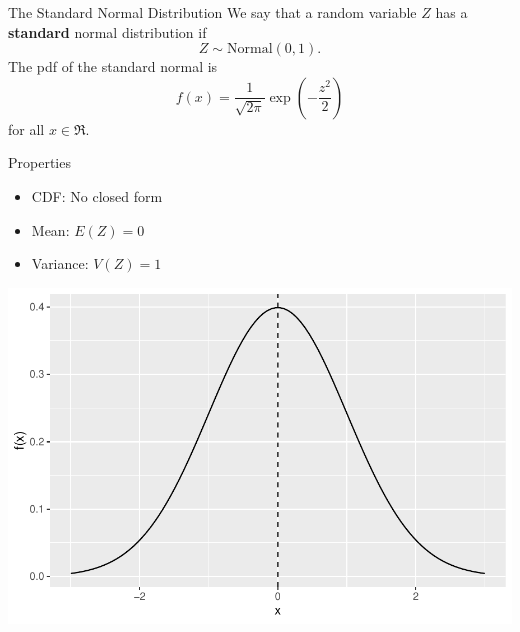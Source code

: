 \begin{frame}
\end{frame}

\begin{frame}
  
  \begin{block}{The Standard Normal Distribution}
    We say that a random variable $Z$ has a \textbf{standard} normal distribution if 
    $$
    Z \sim \mbox{Normal}(0,1).
    $$
    The pdf of the standard normal is
    \[
      f(x)=\frac{1}{\sqrt{2\pi}} \exp\left(-\frac{z^2}{2}\right)
    \]
    for all $x \in \Re$. 
  \end{block}
\end{frame}

\begin{frame}
  \begin{block}{Properties}
        \begin{itemize}
        \item CDF: No closed form

        \item Mean: $E(Z)=0$
        \item Variance: $V(Z)=1$
        \end{itemize}
  \end{block}
\end{frame}

\begin{frame}

  \begin{block}{\examplectd}
    \begin{center}
    \includegraphics[height = .8\textheight]{figure/exercise-20-5}
    \end{center}
  \end{block}
  
\end{frame}

